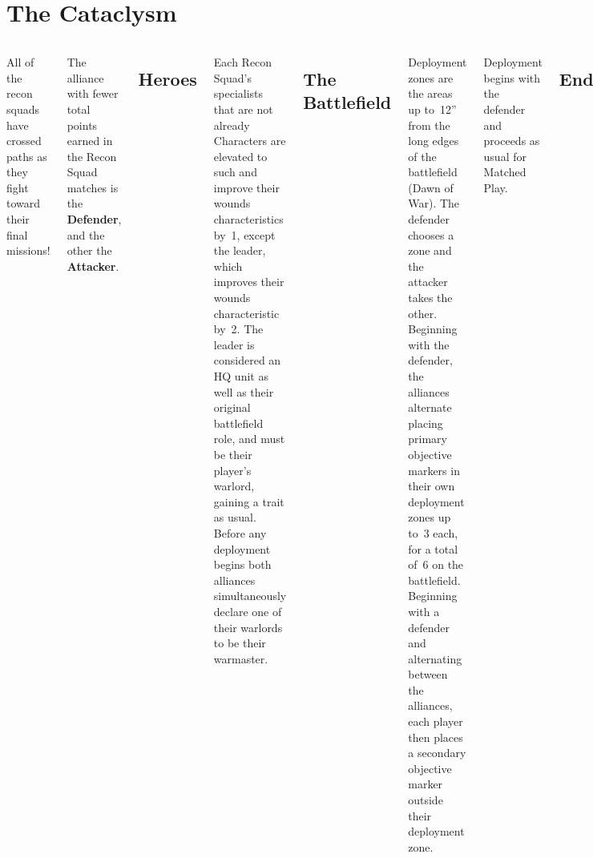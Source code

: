 \section{The Cataclysm}

\begin{columns}
  
  All of the recon squads have crossed paths as they fight toward
  their final missions!

  The alliance with fewer total points earned in the Recon Squad
  matches is the {\bf Defender}, and the other the {\bf Attacker}.

  \subsection{Heroes}

  Each Recon Squad's specialists that are not already Characters are
  elevated to such and improve their wounds characteristics by~1,
  except the leader, which improves their wounds characteristic by~2.
  The leader is considered an HQ unit as well as their original
  battlefield role, and must be their player's warlord, gaining a
  trait as usual.  Before any deployment begins both alliances
  simultaneously declare one of their warlords to be their warmaster.

  \subsection{The Battlefield}

  Deployment zones are the areas up to~12'' from the long edges of the
  battlefield (Dawn of War).  The defender chooses a zone and the
  attacker takes the other.  Beginning with the defender, the
  alliances alternate placing primary objective markers in their own
  deployment zones up to~3 each, for a total of~6 on the battlefield.
  Beginning with a defender and alternating between the alliances,
  each player then places a secondary objective marker outside their
  deployment zone.

  Deployment begins with the defender and proceeds as usual for
  Matched Play.

  \subsection{Endgame}


\end{columns}

